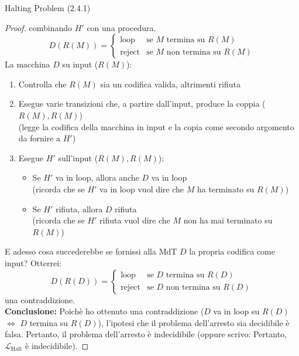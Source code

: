 \documentclass{article}  %
\theoremstyle{definition}
\begin{document}
\begin{theorem}{Halting Problem (2.4.1)}
\begin{proof}
    combinando $H'$ con una procedura. 
    \[
    D(R(M)) =
    \begin{cases}
      \text{loop} & \text{se } M \text{ termina su } R(M)\\
      \text{reject} & \text{se } M \text{  non termina su } R(M)
    \end{cases}
    \]
    La macchina $D$ su input ($R(M)$):
    \begin{enumerate}
      \item Controlla che $R(M)$ sia un codifica valida, altrimenti rifiuta
      \item Esegue varie transizioni che, a partire dall'input, produce la coppia ($R(M),R(M)$) \\
      (legge la codifica della macchina in input e la copia come secondo argomento da fornire a $H'$)
      \item Esegue $H'$ sull'input ($R(M),R(M)$):
      \begin{itemize}
        \item Se $H'$ va in loop, allora anche $D$ va in loop \\
        (ricorda che se $H'$ va in loop vuol dire che $M$ ha terminato su $R(M)$)
        \item Se $H'$ rifiuta, allora $D$ rifiuta \\
        (ricorda che se $H'$ rifiuta vuol dire che $M$ non ha mai terminato su $R(M)$)
      \end{itemize}
    \end{enumerate}
  E adesso cosa succederebbe se fornissi alla MdT $D$ la propria codifica come input? Otterrei:
    \[
    D(R(D)) =
    \begin{cases}
      \text{loop} & \text{se } D \text{ termina su } R(D)\\
      \text{reject} & \text{se } D \text{  non termina su } R(D)
    \end{cases}
    \]
    una contraddizione. \\
    \textbf{Conclusione:} Poichè ho ottenuto una contraddizione ($D$ va in loop su $R(D)$ $\iff$ $D$ termina su $R(D)$), l'ipotesi
    che il problema dell'arresto sia decidibile è falsa. Pertanto, il problema dell'arresto è indecidibile (oppure scrivo: 
    Pertanto, $\mathcal{L}_{\text{Halt}}$ è indecidibile).
  \end{proof}
\end{theorem}
\end{document}
